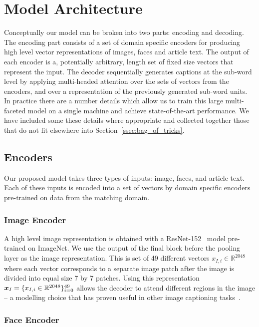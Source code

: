
\section{Model Architecture}

Conceptually our model can be broken into two parts: encoding and decoding. The
encoding part consists of a set of domain specific encoders for producing high
level vector representations of images, faces and article text. The output of
each encoder is a, potentially arbitrary, length set of fixed size vectors that
represent the input. The decoder sequentially generates captions at the
sub-word level by applying
multi-headed attention over the sets of vectors from the encoders, and over a
representation of the previously generated sub-word units. In
practice there are a number details which allow us to train this large
multi-faceted model on a single machine and achieve state-of-the-art
performance. We have included some these details where appropriate and
collected together those that do not fit elsewhere into
Section~\ref{ssec:bag_of_tricks}.

\subsection{Encoders}

Our proposed model takes three types of inputs: image, faces, and article text.
Each of these inputs is encoded into a set of vectors by domain specific
encoders pre-trained on data from the matching domain.

\subsubsection{Image Encoder}

A high level image representation is obtained with a
ResNet-152~\cite{He2016ResNet} model pre-trained on ImageNet. We use the output
of the final block before the
pooling layer as the image representation.
This is set of 49 different vectors $x_{I,i} \in \mathbb{R}^{2048}$ where each
vector corresponds to a separate image patch after the image is divided into
equal size 7 by 7 patches. Using this representation $\bm{x}_I = \{x_{I,i} \in
\mathbb{R}^{2048}\}_{i=0}^{49}$ allows the decoder to attend different regions
in the
image -- a modelling choice that has proven useful in other image captioning
tasks~\cite{Xu2015ShowAA}.

\subsubsection{Face Encoder}

